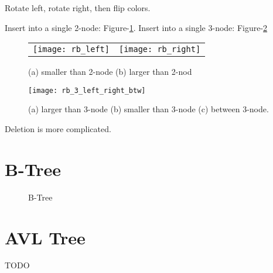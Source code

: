 Rotate left, rotate right, then flip colors.

 Insert into a single 2-node: Figure-\ref{fig:rb_2}. Insert into a single 3-node: Figure-\ref{fig:rb_3}
\begin{figure}[t]
\begin{tabular}{cc}
  \texttt{[image: rb\_left]} &
  \texttt{[image: rb\_right]}\\
\end{tabular}
\caption{(a) smaller than 2-node (b) larger than 2-nod}
\label{fig:rb_2}
\end{figure}

\begin{figure}[t]
        \centerline{\texttt{[image: rb\_3\_left\_right\_btw]}}
        \caption{(a) larger than 3-node (b) smaller than 3-node (c) between 3-node.}
    \label{fig:rb_3}
\end{figure}

 Deletion is more complicated. 

\section{B-Tree}
\begin{figure}[hbtp]
\centering
{}
\caption{B-Tree}
\label{fig:b-tree}
\end{figure}

\section{AVL Tree}
TODO
